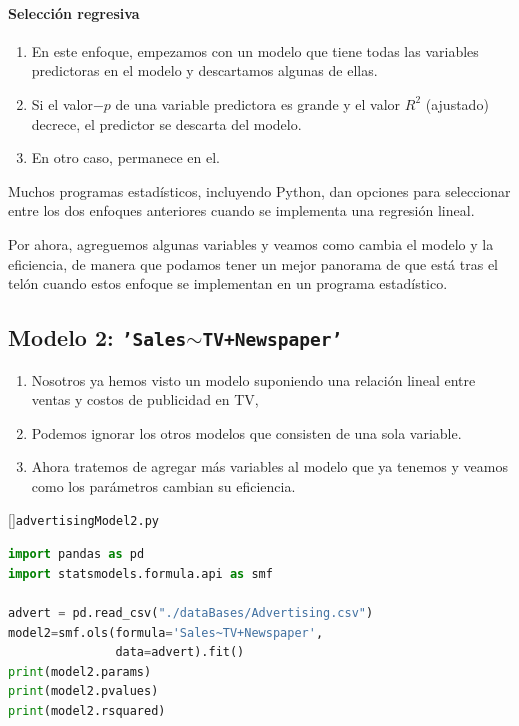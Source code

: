 \paragraph{Selección regresiva}
\begin{enumerate}
 \item En este enfoque, empezamos con un modelo que tiene todas las variables predictoras en el modelo y descartamos algunas de ellas.


\item Si el valor$-p$ de una variable predictora es grande y el valor $R^{2}$ (ajustado) decrece, el predictor se descarta del modelo.



\item En otro caso, permanece en el.
\end{enumerate}



Muchos programas estadísticos, incluyendo Python, dan opciones para seleccionar entre los dos enfoques anteriores cuando se implementa una regresión lineal.


Por ahora, agreguemos algunas variables y veamos como cambia el modelo y la eficiencia, de manera que podamos tener un mejor panorama de que está tras el telón cuando estos enfoque se implementan en un programa estadístico.

\subsection{Modelo 2: \texttt{'Sales$\sim$TV+Newspaper'}}

\begin{enumerate}
 \item Nosotros ya hemos visto un modelo suponiendo una relación lineal entre ventas y costos de publicidad en TV, 
 \item Podemos ignorar los otros modelos que consisten de una sola variable.
 
 \item Ahora tratemos de agregar más variables al modelo que ya tenemos y veamos como los parámetros cambian su eficiencia.
\end{enumerate}


[]{\texttt{advertisingModel2.py}}
\begin{lstlisting}[language=Python]
import pandas as pd
import statsmodels.formula.api as smf

advert = pd.read_csv("./dataBases/Advertising.csv")
model2=smf.ols(formula='Sales~TV+Newspaper',
               data=advert).fit()
print(model2.params)
print(model2.pvalues)
print(model2.rsquared)
\end{lstlisting}


